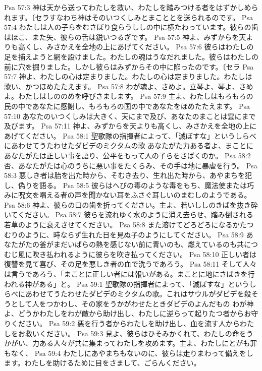 Psa 57:3  神は天から送ってわたしを救い、わたしを踏みつける者をはずかしめられます。〔セラすなわち神はそのいつくしみとまこととを送られるのです。
Psa 57:4  わたしは人の子らをむさぼり食らうししの中に横たわっています。彼らの歯はほこ、また矢、彼らの舌は鋭いつるぎです。
Psa 57:5  神よ、みずからを天よりも高くし、みさかえを全地の上にあげてください。
Psa 57:6  彼らはわたしの足を捕えようと網を設けました。わたしの魂はうなだれました。彼らはわたしの前に穴を掘りました。しかし彼らはみずからその中に陥ったのです。〔セラ
Psa 57:7  神よ、わたしの心は定まりました。わたしの心は定まりました。わたしは歌い、かつほめたたえます。
Psa 57:8  わが魂よ、さめよ。立琴よ、琴よ、さめよ。わたしはしののめを呼びさまします。
Psa 57:9  主よ、わたしはもろもろの民の中であなたに感謝し、もろもろの国の中であなたをほめたたえます。
Psa 57:10  あなたのいつくしみは大きく、天にまで及び、あなたのまことは雲にまで及びます。
Psa 57:11  神よ、みずからを天よりも高くし、みさかえを全地の上にあげてください。
Psa 58:1  聖歌隊の指揮者によって、「滅ぼすな」というしらべにあわせてうたわせたダビデのミクタムの歌 あなたがた力ある者よ、まことにあなたがたは正しい事を語り、公平をもって人の子らをさばくのか。
Psa 58:2  否、あなたがたは心のうちに悪い事をたくらみ、その手は地に暴虐を行う。
Psa 58:3  悪しき者は胎を出た時から、そむき去り、生れ出た時から、あやまちを犯し、偽りを語る。
Psa 58:5  彼らはへびの毒のような毒をもち、魔法使または巧みに呪文を唱える者の声を聞かない耳をふさぐ耳しいのまむしのようである。
Psa 58:6  神よ、彼らの口の歯を折ってください。主よ、若いししのきばを抜き砕いてください。
Psa 58:7  彼らを流れゆく水のように消え去らせ、踏み倒される若草のように衰えさせてください。
Psa 58:8  また溶けてどろどろになるかたつむりのように、時ならず生れた日を見ぬ子のようにしてください。
Psa 58:9  あなたがたの釜がまだいばらの熱を感じない前に青いのも、燃えているのも共につむじ風に吹き払われるように彼らを吹き払ってください。
Psa 58:10  正しい者は復讐を見て喜び、その足を悪しき者の血で洗うであろう。
Psa 58:11  そして人々は言うであろう、「まことに正しい者には報いがある。まことに地にさばきを行われる神がある」と。
Psa 59:1  聖歌隊の指揮者によって、「滅ぼすな」というしらべにあわせてうたわせたダビデのミクタムの歌。これはサウルがダビデを殺そうとして人をつかわし、その家をうかがわせたときダビデのよんだもの わが神よ、どうかわたしをわが敵から助け出し、わたしに逆らって起りたつ者からお守りください。
Psa 59:2  悪を行う者からわたしを助け出し、血を流す人からわたしをお救いください。
Psa 59:3  見よ、彼らはひそみかくれて、わたしの命をうかがい、力ある人々が共に集まってわたしを攻めます。主よ、わたしにとがも罪もなく、
Psa 59:4  わたしにあやまちもないのに、彼らは走りまわって備えをします。わたしを助けるために目をさまして、ごらんください。
